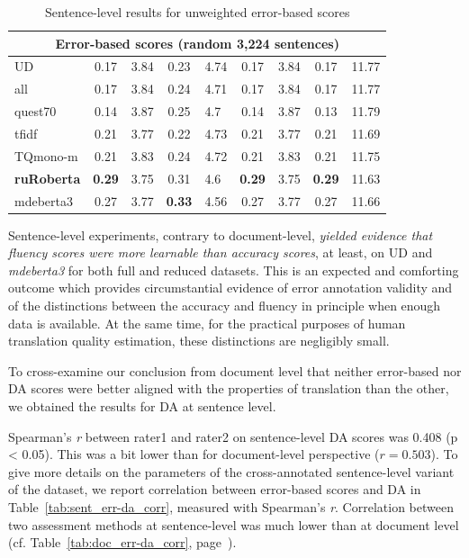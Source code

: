 \begin{table}[H]
\begin{tabular}{l|cl|cl|cl|cl}
		\multicolumn{9}{c}{Error-based scores (random 3,224 sentences)} \\
		\midrule
		UD              & 0.17 & 3.84 & 0.23 & 4.74 & 0.17 & 3.84 & 0.17 & 11.77 \\
		all             & 0.17 & 3.84 & 0.24 & 4.71 & 0.17 & 3.84 & 0.17 & 11.77 \\
		quest70         & 0.14 & 3.87 & 0.25 & 4.7  & 0.14 & 3.87 & 0.13 & 11.79 \\
		\midrule
		tfidf           & 0.21 & 3.77 & 0.22 & 4.73 & 0.21 & 3.77 & 0.21 & 11.69 \\
		\midrule
		TQmono-m        & 0.21 & 3.83 & 0.24 & 4.72 & 0.21 & 3.83 & 0.21 & 11.75 \\
		\textbf{ruRoberta} & \textbf{0.29} & 3.75 & 0.31 & 4.6  & \textbf{0.29} & 3.75 & \textbf{0.29} & 11.63 \\
		mdeberta3  & 0.27 & 3.77 & \textbf{0.33} & 4.56 & 0.27 & 3.77 & 0.27 & 11.66 \\
		\bottomrule
	\end{tabular}
	\caption{\label{tab:sent_err_double}Sentence-level results for unweighted error-based scores}
\end{table}


Sentence-level experiments, contrary to document-level, \textit{yielded evidence that fluency scores were more learnable than accuracy scores}, at least, on UD and \textit{mdeberta3} for both full and reduced datasets. 
This is an expected and comforting outcome which provides circumstantial evidence of error annotation validity and of the distinctions between the accuracy and fluency in principle when enough data is available. At the same time, for the practical purposes of human translation quality estimation, these distinctions are negligibly small. 

To cross-examine our conclusion from document level that neither error-based nor DA scores were better aligned with the properties of translation than the other, we obtained the results for DA at sentence level. 

Spearman's \textit{r} between rater1 and rater2 on sentence-level DA scores was 0.408 (p < 0.05). This was a bit lower than for document-level perspective ($r=0.503$). To give more details on the parameters of the cross-annotated sentence-level variant of the dataset, we report correlation between error-based scores and DA in Table~\ref{tab:sent_err-da_corr}, measured with Spearman's \textit{r}. Correlation between two assessment methods at sentence-level was much lower than at document level (cf. Table~\ref{tab:doc_err-da_corr}, page~\pageref{tab:doc_err-da_corr}).

